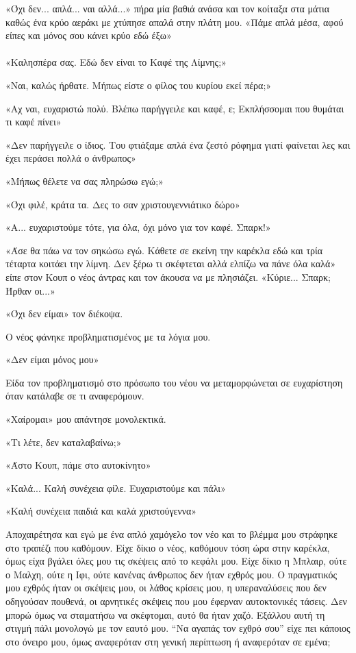 \documentclass[12pt,twoside, openany]{book}
\begin{document}
«Όχι δεν... απλά... ναι αλλά...» πήρα μία βαθιά ανάσα και τον κοίταξα στα μάτια καθώς ένα κρύο αεράκι με χτύπησε απαλά στην πλάτη μου. «Πάμε απλά μέσα, αφού είπες και μόνος σου κάνει κρύο εδώ έξω»\\\\

«Καλησπέρα σας. Εδώ δεν είναι το Καφέ της Λίμνης;»

«Ναι, καλώς ήρθατε. Μήπως είστε ο φίλος του κυρίου εκεί πέρα;»

«Αχ ναι, ευχαριστώ πολύ. Βλέπω παρήγγειλε και καφέ, ε; Εκπλήσσομαι που θυμάται τι καφέ πίνει»

«Δεν παρήγγειλε ο ίδιος. Του φτιάξαμε απλά ένα ζεστό ρόφημα γιατί φαίνεται λες και έχει περάσει πολλά ο άνθρωπος»

«Μήπως θέλετε να σας πληρώσω εγώ;»

«Όχι φιλέ, κράτα τα. Δες το σαν χριστουγεννιάτικο δώρο»

«Α... ευχαριστούμε τότε, για όλα, όχι μόνο για τον καφέ. Σπαρκ!»

«Άσε θα πάω να τον σηκώσω εγώ. Κάθετε σε εκείνη την καρέκλα εδώ και τρία τέταρτα κοιτάει την λίμνη. Δεν ξέρω τι σκέφτεται αλλά ελπίζω να πάνε όλα καλά» είπε στον Κουπ ο νέος άντρας και τον άκουσα να με πλησιάζει. «Κύριε... Σπαρκ; Ήρθαν οι...»

«Όχι δεν είμαι» τον διέκοψα.

Ο νέος φάνηκε προβληματισμένος με τα λόγια μου.

«Δεν είμαι μόνος μου»

Είδα τον προβληματισμό στο πρόσωπο του νέου να μεταμορφώνεται σε ευχαρίστηση όταν κατάλαβε σε τι αναφερόμουν.

«Χαίρομαι» μου απάντησε μονολεκτικά.

«Τι λέτε, δεν καταλαβαίνω;»

«Άστο Κουπ, πάμε στο αυτοκίνητο»

«Καλά... Καλή συνέχεια φίλε. Ευχαριστούμε και πάλι»

«Καλή συνέχεια παιδιά και καλά χριστούγεννα»

Αποχαιρέτησα και εγώ με ένα απλό χαμόγελο τον νέο και το βλέμμα μου στράφηκε στο τραπέζι που καθόμουν. Είχε δίκιο ο νέος, καθόμουν τόση ώρα στην καρέκλα, όμως είχα βγάλει όλες μου τις σκέψεις από το κεφάλι μου. Είχε δίκιο η Μπλαιρ, ούτε ο Μαλχη, ούτε η Ιφι, ούτε κανένας άνθρωπος δεν ήταν εχθρός μου. Ο πραγματικός μου εχθρός ήταν οι σκέψεις μου, οι λάθος κρίσεις μου, η υπεραναλύσεις που δεν οδηγούσαν πουθενά, οι αρνητικές σκέψεις που μου έφερναν αυτοκτονικές τάσεις. Δεν μπορώ όμως να σταματήσω να σκέφτομαι, αυτό θα ήταν χαζό. Εξάλλου αυτή τη στιγμή πάλι μονολογώ με τον εαυτό μου. “Να αγαπάς τον εχθρό σου” είχε πει κάποιος στο όνειρο μου, όμως αναφερόταν στη γενική περίπτωση ή αναφερόταν σε εμένα;
\end{document}
